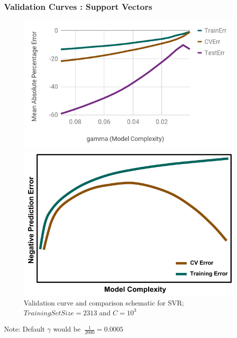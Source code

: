 \begin{frame}
  \frametitle{Validation Curves : Support Vectors}
  \begin{figure}
    \begin{minipage}{0.65\textwidth}
      \centering
      \includegraphics[width=\linewidth]{./figures/svr-valid.png}
    \end{minipage}%
    \begin{minipage}{0.4\textwidth}
      \centering
      \includegraphics[width=\linewidth]{./figures/NegValidCurve.png}
    \end{minipage}
    \caption{Validation curve and comparison schematic for SVR; $Training Set Size=2313$ and $C=10^3$}
  \end{figure}
  \footnotesize
  Note: Default $\gamma$ would be $~\frac{1}{2000}=0.0005$
\end{frame}

